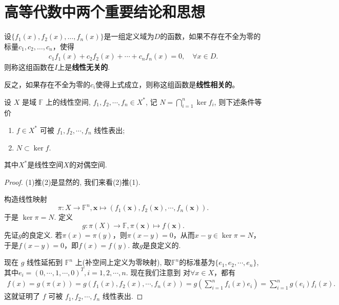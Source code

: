 \documentclass[../../main.tex]{subfiles}
\begin{document}
\section{高等代数中两个重要结论和思想}

\begin{definition}[函数组线性无关/相关]
设\(\{f_1(x), f_2(x), \ldots, f_n(x)\}\)是一组定义域为$D$的函数，如果不存在不全为零的标量\(c_1, c_2, \ldots, c_n\)，使得 
\begin{align*}
c_1 f_1(x) + c_2 f_2(x) + \cdots + c_n f_n(x) = 0,\quad \forall x\in D.
\end{align*}
则称这组函数在\(I\)上是\textbf{线性无关的}.

反之，如果存在不全为零的\(c_i\)使得上式成立，则称这组函数是\textbf{线性相关的}。
\end{definition}

\begin{theorem}\label{theorem:高等代数的重要结论1}
设 \( X \) 是域 \( \mathbb{F} \) 上的线性空间, \( f_1, f_2, \cdots, f_n \in X^* \), 记 \( N = \bigcap_{i=1}^n \ker f_i \), 则下述条件等价
\begin{enumerate}[(1)]
\item \( f \in X^* \) 可被 \( f_1, f_2, \cdots, f_n \) 线性表出;

\item \( N \subset \ker f \).
\end{enumerate}
其中$X^*$是线性空间$X$的对偶空间.
\end{theorem}
\begin{proof}
(1)推(2)是显然的, 我们来看(2)推(1).

构造线性映射
\[
\pi: X \to \mathbb{F}^n, \mathbf{x} \mapsto (f_1(\mathbf{x}), f_2(\mathbf{x}), \cdots, f_n(\mathbf{x})).
\]
于是 \( \ker \pi = N \). 定义
\[
g: \pi(X) \to \mathbb{F}, \pi(\mathbf{x}) \mapsto f(\mathbf{x}).
\]
先证$g$的良定义. 若$\pi(x) = \pi(y)$，则$\pi(x - y) = 0$，从而$x - y \in \ker \pi = N$，于是$f(x - y) = 0$，即$f(x) = f(y)$. 故$g$是良定义的.

现在 \( g \) 线性延拓到 \( \mathbb{F}^n \) 上(补空间上定义为零映射), 取$\mathbb{F}^n$的标准基为$\{e_1,e_2,\cdots,e_n\}$,其中$e_i=(0,\cdots,1,\cdots,0)^T,i=1,2,\cdots,n$.
现在我们注意到
对$\forall x \in X$，都有
\begin{align*}
f(x) = g(\pi(x)) = g(f_1(x), f_2(x), \cdots, f_n(x)) = g\left( \sum_{i=1}^n f_i(x) e_i \right) = \sum_{i=1}^n g(e_i) f_i(x).
\end{align*}
这就证明了 \( f \) 可被 \( f_1, f_2, \cdots, f_n \) 线性表出.
\end{proof}
\end{document}
